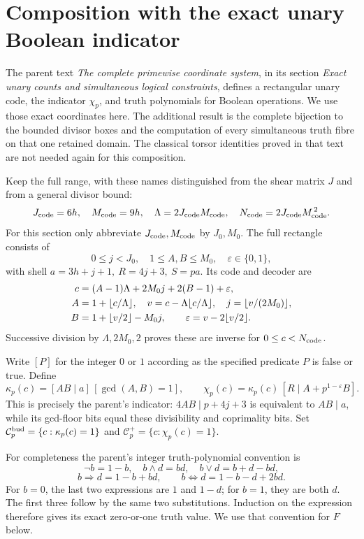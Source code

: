 \section{Composition with the exact unary Boolean indicator}
\label{sec:unary-transport}

The parent text \emph{The complete primewise coordinate system},
in its section \emph{Exact unary counts and simultaneous logical
constraints}, defines a rectangular unary code, the indicator
\(\chi_p\), and truth polynomials for Boolean operations.
We use those exact coordinates here.  The additional result is the
complete bijection to the bounded divisor boxes and the computation
of every simultaneous truth fibre on that one retained domain.
The classical torsor identities proved in that text are not needed
again for this composition.

Keep the full range, with these names distinguished from
the shear matrix \(J\) and from a general divisor bound:
\[
 J_{\rm code}=6h,\quad M_{\rm code}=9h,\quad
 \Lambda=2J_{\rm code}M_{\rm code},\quad
 N_{\rm code}=2J_{\rm code}M_{\rm code}^{\,2}.
\]
For this section only abbreviate \(J_{\rm code},M_{\rm code}\)
by \(J_0,M_0\).  The full rectangle consists of
\[
 0\le j<J_0,\quad 1\le A,B\le M_0,\quad
 \varepsilon\in\{0,1\},
\]
with shell \(a=3h+j+1,\ R=4j+3,\ S=pa\).
Its code and decoder are
\begin{align}
 c&=(A-1)\Lambda+2M_0j+2(B-1)+\varepsilon,
       \label{eq:unary-code}\\
 A&=1+\lfloor c/\Lambda\rfloor,\quad
 v=c-\Lambda\lfloor c/\Lambda\rfloor,\quad
 j=\lfloor v/(2M_0)\rfloor,\notag\\
 B&=1+\lfloor v/2\rfloor-M_0j,\qquad
 \varepsilon=v-2\lfloor v/2\rfloor. \notag
\end{align}
Successive division by \(\Lambda,2M_0,2\) proves these are
inverse for \(0\le c<N_{\rm code}\).

Write \([P]\) for the integer \(0\) or \(1\) according as the
specified predicate \(P\) is false or true.  Define
\[
 \kappa_p(c)=[AB\mid a]\,[\gcd(A,B)=1],\qquad
 \chi_p(c)=\kappa_p(c)\,[R\mid A+p^{1-\varepsilon}B].
\]
This is precisely the parent's indicator: \(4AB\mid p+4j+3\)
is equivalent to \(AB\mid a\), while its gcd-floor bits
equal these divisibility and coprimality bits.
Set \(\mathcal C_p^{\rm bud}=\{c:\kappa_p(c)=1\}\) and
\(\mathcal C_p^+=\{c:\chi_p(c)=1\}\).

For completeness the parent's integer truth-polynomial convention is
\[
 \neg b=1-b,\quad b\land d=bd,\quad b\lor d=b+d-bd,
\]
\[
 b\Rightarrow d=1-b+bd,\qquad
 b\Longleftrightarrow d=1-b-d+2bd.
\]
For \(b=0\), the last two expressions are \(1\) and
\(1-d\); for \(b=1\), they are both \(d\).
The first three follow by the same two substitutions.
Induction on the expression therefore gives its exact
zero-or-one truth value.  We use that convention for \(F\) below.


